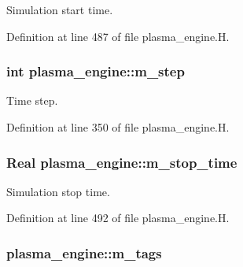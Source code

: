 Simulation start time. 



Definition at line 487 of file plasma\+\_\+engine.\+H.

\subsubsection[{\texorpdfstring{m\+\_\+step}{m_step}}]{\setlength{\rightskip}{0pt plus 5cm}int plasma\+\_\+engine\+::m\+\_\+step\hspace{0.3cm}{\ttfamily [protected]}}\hypertarget{classplasma__engine_a3aa7457ef6831689de8a12559195c8c7}{}\label{classplasma__engine_a3aa7457ef6831689de8a12559195c8c7}


Time step. 



Definition at line 350 of file plasma\+\_\+engine.\+H.

\subsubsection[{\texorpdfstring{m\+\_\+stop\+\_\+time}{m_stop_time}}]{\setlength{\rightskip}{0pt plus 5cm}Real plasma\+\_\+engine\+::m\+\_\+stop\+\_\+time\hspace{0.3cm}{\ttfamily [protected]}}\hypertarget{classplasma__engine_a148b332ad9c1d35b25b9479771502d3c}{}\label{classplasma__engine_a148b332ad9c1d35b25b9479771502d3c}


Simulation stop time. 



Definition at line 492 of file plasma\+\_\+engine.\+H.

\subsubsection[{\texorpdfstring{m\+\_\+tags}{m_tags}}]{ plasma\+\_\+engine\+::m\+\_\+tags\hspace{0.3cm}{\ttfamily [protected]}}\hypertarget{classplasma__engine_afc8dad643656a8476b83195aab88cddb}{}\label{classplasma__engine_afc8dad643656a8476b83195aab88cddb}


